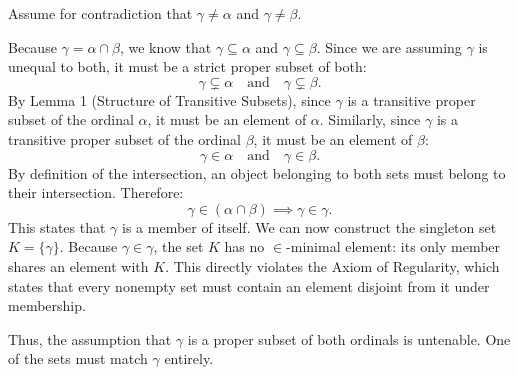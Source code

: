 Assume for contradiction that $\gamma \neq \alpha$ and $\gamma \neq \beta$. 

Because $\gamma = \alpha \cap \beta$, we know that $\gamma \subseteq \alpha$ and $\gamma \subseteq \beta$. Since we are assuming $\gamma$ is unequal to both, it must be a strict proper subset of both:
\[
\gamma \subsetneq \alpha \quad \text{and} \quad \gamma \subsetneq \beta.
\]
By Lemma 1 (Structure of Transitive Subsets), since $\gamma$ is a transitive proper subset of the ordinal $\alpha$, it must be an element of $\alpha$. Similarly, since $\gamma$ is a transitive proper subset of the ordinal $\beta$, it must be an element of $\beta$:
\[
\gamma \in \alpha \quad \text{and} \quad \gamma \in \beta.
\]
By definition of the intersection, an object belonging to both sets must belong to their intersection. Therefore:
\[
\gamma \in (\alpha \cap \beta) \implies \gamma \in \gamma.
\]
This states that $\gamma$ is a member of itself. We can now construct the singleton set $K = \{\gamma\}$. Because $\gamma \in \gamma$, the set $K$ has no $\in$-minimal element: its only member shares an element with $K$. This directly violates the Axiom of Regularity, which states that every nonempty set must contain an element disjoint from it under membership. 

Thus, the assumption that $\gamma$ is a proper subset of both ordinals is untenable. One of the sets must match $\gamma$ entirely.

